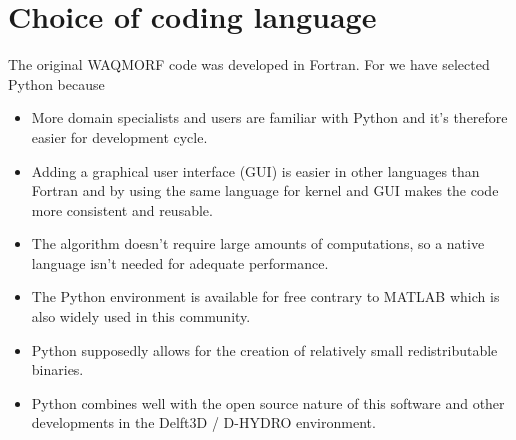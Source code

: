 \section{Choice of coding language}

The original WAQMORF code was developed in Fortran.
For \dfastmi we have selected Python because

\begin{itemize}
\item More domain specialists and users are familiar with Python and it's therefore easier for development cycle.
\item Adding a graphical user interface (GUI) is easier in other languages than Fortran and by using the same language for kernel and GUI makes the code more consistent and reusable.
\item The algorithm doesn't require large amounts of computations, so a native language isn't needed for adequate performance.
\item The Python environment is available for free contrary to MATLAB which is also widely used in this community.
\item Python supposedly allows for the creation of relatively small redistributable binaries.
\item Python combines well with the open source nature of this software and other developments in the Delft3D / D-HYDRO environment.
\end{itemize}
